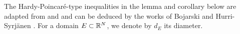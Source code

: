 \documentclass[a4paper,10pt]{amsart}
\numberwithin{equation}{section}
\begin{document}

The Hardy-Poincar\'{e}-type inequalities in the lemma and corollary below are adapted from \cite[Section 3.2]{Pog} and \cite[Lemma 2.1]{MP3} and can be deduced by the works of Bojarski \cite{Bo} and Hurri-Syrj\"anen \cite{HS1, HS}.  For a domain $E\subset \mathbb{R}^N$, we denote by $d_E$ its diameter.

\end{document}
